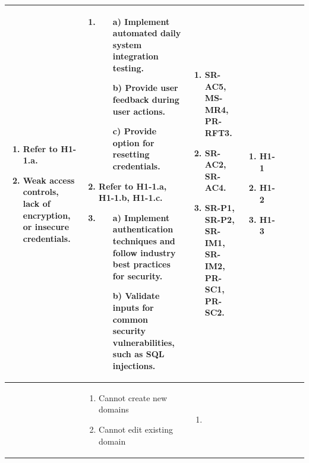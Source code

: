 \documentclass{article}
\begin{document}
\begin{landscape}
\begin{longtable}{|p{2cm}|p{4cm}|p{4cm}|p{4cm}|p{4cm}|p{2cm}|p{2cm}|}
\begin{enumerate}[leftmargin=*]
    \item Refer to H1-1.a.
    \item Weak access controls, lack of encryption, or insecure credentials.
  \end{enumerate} &
  \begin{enumerate}[leftmargin=*]
    \item
    \begin{enumerate}
        \item[a)] Implement automated daily system integration testing.
        \item[b)] Provide user feedback during user actions.
        \item[c)] Provide option for resetting credentials.
    \end{enumerate}
    \item Refer to H1-1.a, H1-1.b, H1-1.c.
    \item
    \begin{enumerate}
        \item[a)] Implement authentication techniques and follow industry best practices for security.
        \item[b)] Validate inputs for common security vulnerabilities, such as SQL injections.
    \end{enumerate}
  \end{enumerate} &
  \begin{enumerate}[leftmargin=*]
    \item SR-AC5, MS-MR4, PR-RFT3.
    \item SR-AC2, SR-AC4.
    \item SR-P1, SR-P2, SR-IM1, SR-IM2, PR-SC1, PR-SC2.
  \end{enumerate} &
  \begin{enumerate}[leftmargin=*]
    \item H1-1
    \item H1-2
    \item H1-3
  \end{enumerate} \\
  \hline
   &
  \begin{enumerate}[leftmargin=*]
      \item Cannot create new domains
      \item Cannot edit existing domain
  \end{enumerate} &
  \begin{enumerate}[leftmargin=*]
    \item

\end{enumerate}
\end{longtable}
\end{landscape}
\end{document}
